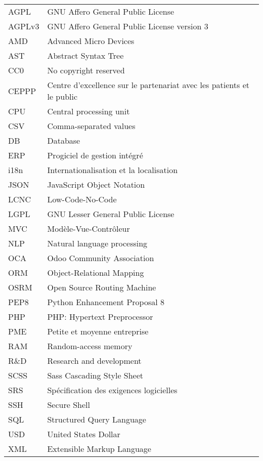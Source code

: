 \chapter*{\abbrevname}
\pagestyle{pagenumber}
%
\begin{acronym}
\end{acronym}
%
\begin{longtable}{lp{5in}}
AGPL      & GNU Affero General Public License\\
AGPLv3    & GNU Affero General Public License version 3\\
AMD       & Advanced Micro Devices\\
AST       & Abstract Syntax Tree\\
CC0       & No copyright reserved\\
CEPPP     & Centre d'excellence sur le partenariat avec les patients et le public\\
CPU       & Central processing unit\\
CSV       & Comma-separated values\\
DB        & Database\\
ERP       & Progiciel de gestion intégré\\
i18n      & Internationalisation et la localisation\\
JSON      & JavaScript Object Notation\\
LCNC      & Low-Code-No-Code\\
LGPL      & GNU Lesser General Public License\\
MVC       & Modèle-Vue-Contrôleur\\
NLP       & Natural language processing\\
OCA       & Odoo Community Association\\
ORM       & Object-Relational Mapping\\
OSRM      & Open Source Routing Machine\\
PEP8      & Python Enhancement Proposal 8\\
PHP       & PHP: Hypertext Preprocessor\\
PME       & Petite et moyenne entreprise\\
RAM       & Random-access memory\\
R\&D      & Research and development\\
SCSS      & Sass Cascading Style Sheet\\
SRS       & Spécification des exigences logicielles\\
SSH       & Secure Shell\\
SQL       & Structured Query Language\\
USD       & United States Dollar\\
XML       & Extensible Markup Language\\

\end{longtable}
